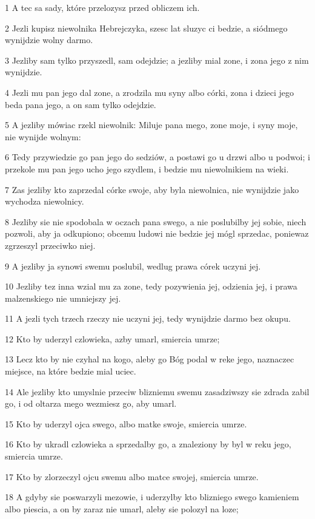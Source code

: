 \par 1 A tec sa sady, które przelozysz przed obliczem ich.
\par 2 Jezli kupisz niewolnika Hebrejczyka, szesc lat sluzyc ci bedzie, a siódmego wynijdzie wolny darmo.
\par 3 Jezliby sam tylko przyszedl, sam odejdzie; a jezliby mial zone, i zona jego z nim wynijdzie.
\par 4 Jezli mu pan jego dal zone, a zrodzila mu syny albo córki, zona i dzieci jego beda pana jego, a on sam tylko odejdzie.
\par 5 A jezliby mówiac rzekl niewolnik: Miluje pana mego, zone moje, i syny moje, nie wynijde wolnym:
\par 6 Tedy przywiedzie go pan jego do sedziów, a postawi go u drzwi albo u podwoi; i przekole mu pan jego ucho jego szydlem, i bedzie mu niewolnikiem na wieki.
\par 7 Zas jezliby kto zaprzedal córke swoje, aby byla niewolnica, nie wynijdzie jako wychodza niewolnicy.
\par 8 Jezliby sie nie spodobala w oczach pana swego, a nie poslubilby jej sobie, niech pozwoli, aby ja odkupiono; obcemu ludowi nie bedzie jej mógl sprzedac, poniewaz zgrzeszyl przeciwko niej.
\par 9 A jezliby ja synowi swemu poslubil, wedlug prawa córek uczyni jej.
\par 10 Jezliby tez inna wzial mu za zone, tedy pozywienia jej, odzienia jej, i prawa malzenskiego nie umniejszy jej.
\par 11 A jezli tych trzech rzeczy nie uczyni jej, tedy wynijdzie darmo bez okupu.
\par 12 Kto by uderzyl czlowieka, azby umarl, smiercia umrze;
\par 13 Lecz kto by nie czyhal na kogo, aleby go Bóg podal w reke jego, naznaczec miejsce, na które bedzie mial uciec.
\par 14 Ale jezliby kto umyslnie przeciw blizniemu swemu zasadziwszy sie zdrada zabil go, i od oltarza mego wezmiesz go, aby umarl.
\par 15 Kto by uderzyl ojca swego, albo matke swoje, smiercia umrze.
\par 16 Kto by ukradl czlowieka a sprzedalby go, a znaleziony by byl w reku jego, smiercia umrze.
\par 17 Kto by zlorzeczyl ojcu swemu albo matce swojej, smiercia umrze.
\par 18 A gdyby sie poswarzyli mezowie, i uderzylby kto blizniego swego kamieniem albo piescia, a on by zaraz nie umarl, aleby sie polozyl na loze;
